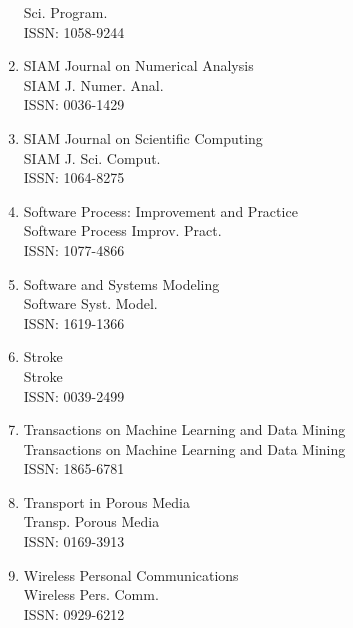 \begin{enumerate}
 Sci. Program.\\
 ISSN: 1058-9244
\item
 SIAM Journal on Numerical Analysis\\
 SIAM J. Numer. Anal.\\
 ISSN: 0036-1429
\item
 SIAM Journal on Scientific Computing\\
 SIAM J. Sci. Comput.\\
 ISSN: 1064-8275
\item
 Software Process: Improvement and Practice\\
 Software Process Improv. Pract.\\
 ISSN: 1077-4866
\item
 Software and Systems Modeling\\
 Software Syst. Model.\\
 ISSN: 1619-1366
\item
 Stroke\\
 Stroke\\
 ISSN: 0039-2499
\item
 Transactions on Machine Learning and Data Mining\\
 Transactions on Machine Learning and Data Mining\\
 ISSN: 1865-6781
\item
 Transport in Porous Media\\
 Transp. Porous Media\\
 ISSN: 0169-3913
\item
 Wireless Personal Communications\\
 Wireless Pers. Comm.\\
 ISSN: 0929-6212
\end{enumerate}